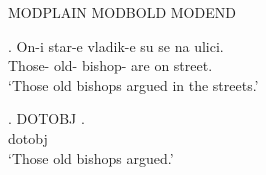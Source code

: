 

%
%

\noindent MODPLAIN  MODBOLD  MODEND

\exg. On-i star-e vladik-e su se  na ulici.\\
    Those- old- bishop-
    are  
    on street.\\
    `Those old bishops argued in the streets.'

\exg. DOTOBJ .\\
    dotobj \\
    `Those old bishops argued.'

